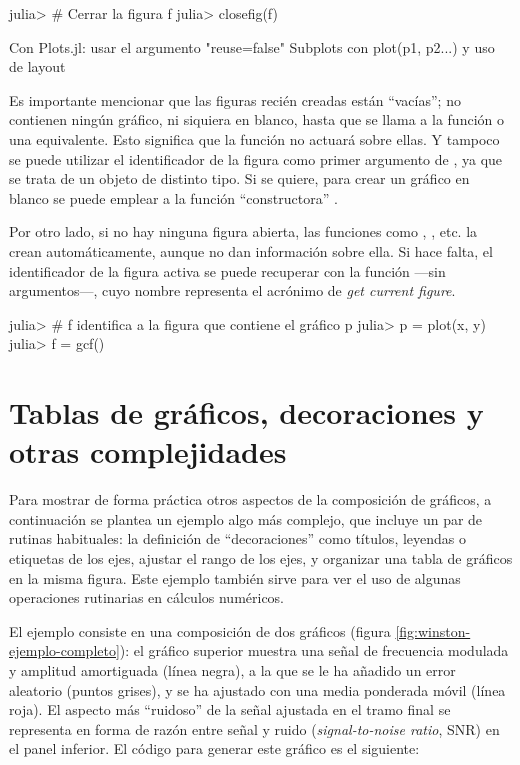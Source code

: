 \begin{jlconcode}
julia> # Cerrar la figura f
julia> closefig(f)
\end{jlconcode}


Con Plots.jl: usar el argumento "reuse=false"
Subplots con plot(p1, p2...) y uso de layout


Es importante mencionar que las figuras recién creadas están ``vacías''; no contienen ningún gráfico, ni siquiera en blanco, hasta que se llama a la función  o una equivalente. Esto significa que la función  no actuará sobre ellas. Y tampoco se puede utilizar el identificador de la figura como primer argumento de , ya que se trata de un objeto de distinto tipo. Si se quiere, para crear un gráfico en blanco se puede emplear a la función ``constructora'' .

Por otro lado, si no hay ninguna figura abierta, las funciones como , , etc. la crean automáticamente, aunque no dan información sobre ella. Si hace falta, el identificador de la figura activa se puede recuperar con la función  ---sin argumentos---, cuyo nombre representa el acrónimo de \emph{get current figure}.

\begin{jlconcode}
julia> # f identifica a la figura que contiene el gráfico p
julia> p = plot(x, y)
julia> f = gcf()
\end{jlconcode}


\section{Tablas de gráficos, decoraciones y otras complejidades}

Para mostrar de forma práctica otros aspectos de la composición de gráficos, a continuación se plantea un ejemplo algo más complejo, que incluye un par de rutinas habituales: la definición de ``decoraciones'' como títulos, leyendas o etiquetas de los ejes, ajustar el rango de los ejes, y organizar una tabla de gráficos en la misma figura. Este ejemplo también sirve para ver el uso de algunas operaciones rutinarias en cálculos numéricos.

El ejemplo consiste en una composición de dos gráficos (figura \ref{fig:winston-ejemplo-completo}): el gráfico superior muestra una señal de frecuencia modulada y amplitud amortiguada (línea negra), a la que se le ha añadido un error aleatorio (puntos grises), y se ha ajustado con una media ponderada móvil (línea roja). El aspecto más ``ruidoso'' de la señal ajustada en el tramo final se representa en forma de razón entre señal y ruido (\emph{signal-to-noise ratio}, SNR) en el panel inferior. El código para generar este gráfico es el siguiente:


